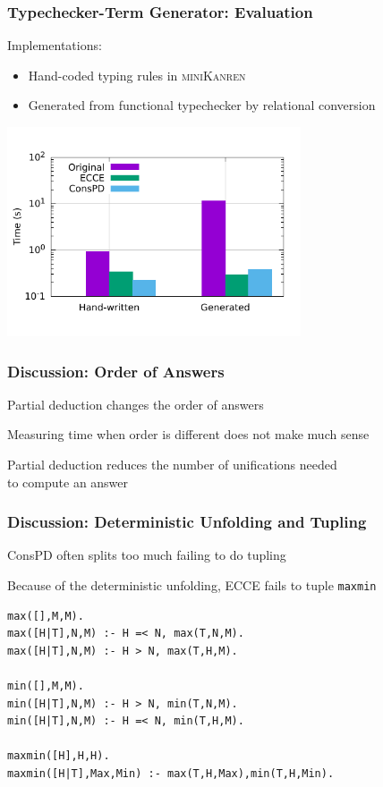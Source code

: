 \documentclass[xcolor=table]{beamer}
\newcommand{\mk}{\textsc{miniKanren}\xspace}
\begin{document}
\begin{frame}[fragile]
  \frametitle{Typechecker-Term Generator: Evaluation}

Implementations:
\begin{itemize}
  \item Hand-coded typing rules in \mk
  \item Generated from functional typechecker by relational conversion
\end{itemize}

  \begin{center}
    \includegraphics[width=0.65\textwidth]{pictures/type/ltypelog.pdf}
  \end{center}
\end{frame}

\begin{frame}[fragile]
  \frametitle{Discussion: Order of Answers}
\begin{center}
  Partial deduction changes the order of answers
\end{center}

\begin{center}
  Measuring time when order is different does not make much sense
\end{center}

\begin{center}
  Partial deduction reduces the number of unifications needed \\ to compute an answer
\end{center}

\end{frame}

\begin{frame}[fragile]
  \frametitle{Discussion: Deterministic Unfolding and Tupling}
\begin{center}
  ConsPD often splits too much failing to do tupling
\end{center}

\begin{center}
  Because of the deterministic unfolding, ECCE fails to tuple \lstinline{maxmin}
\end{center}

\begin{lstlisting}
max([],M,M).
max([H|T],N,M) :- H =< N, max(T,N,M).
max([H|T],N,M) :- H > N, max(T,H,M).

min([],M,M).
min([H|T],N,M) :- H > N, min(T,N,M).
min([H|T],N,M) :- H =< N, min(T,H,M).

maxmin([H],H,H).
maxmin([H|T],Max,Min) :- max(T,H,Max),min(T,H,Min).
\end{lstlisting}
\end{frame}
\end{document}
